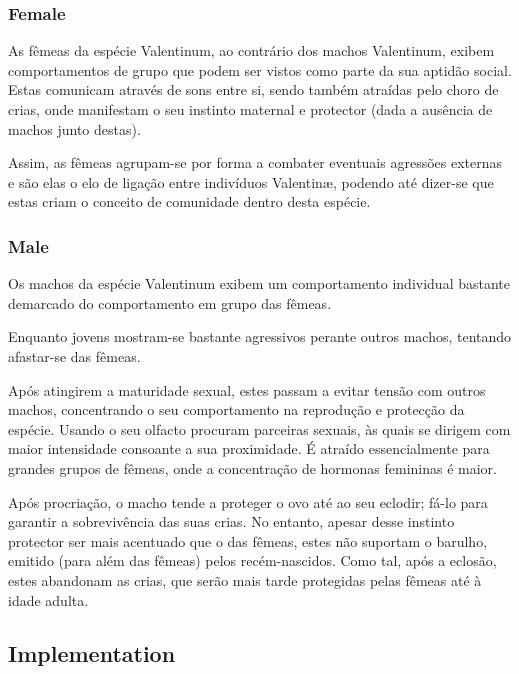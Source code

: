 \documentclass[a4paper]{article}
\begin{document}
\subsubsection{Female}

\indent \indent As fêmeas da espécie Valentinum, ao contrário dos machos Valentinum, exibem comportamentos de grupo que podem ser vistos como parte da sua aptidão social. Estas comunicam através de sons entre si, sendo também atraídas pelo choro de crias, onde manifestam o seu instinto maternal e protector (dada a ausência de machos junto destas).

Assim, as fêmeas agrupam-se por forma a combater eventuais agressões externas e são elas o elo de ligação entre indivíduos Valentin\ae, podendo até dizer-se que estas criam o conceito de comunidade dentro desta espécie.

\subsubsection{Male}

\indent \indent Os machos da espécie Valentinum exibem um comportamento individual bastante demarcado do comportamento em grupo das fêmeas.

Enquanto jovens mostram-se bastante agressivos perante outros machos, tentando afastar-se das fêmeas.

Após atingirem a maturidade sexual, estes passam a evitar tensão com outros machos, concentrando o seu comportamento na reprodução e protecção da espécie. Usando o seu olfacto procuram parceiras sexuais, às quais se dirigem com maior intensidade consoante a sua proximidade. É atraído essencialmente para grandes grupos de fêmeas, onde a concentração de hormonas femininas é maior.

Após procriação, o macho tende a proteger o ovo até ao seu eclodir; fá-lo para garantir a sobrevivência das suas crias. No entanto, apesar desse instinto protector ser mais acentuado que o das fêmeas, estes não suportam o barulho, emitido (para além das fêmeas) pelos recém-nascidos. Como tal, após a eclosão, estes abandonam as crias, que serão mais tarde protegidas pelas fêmeas até à idade adulta.


\subsection{Implementation}
\end{document}
